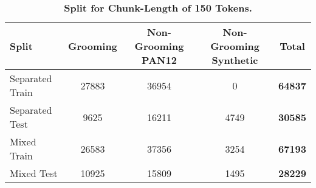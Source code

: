\begin{table}[H]
\centering
\small
\begin{tabular}{lcccc}
\hline
Split & Grooming & Non-Grooming PAN12 & Non-Grooming Synthetic & \textbf{Total} \\
\hline
Separated Train & 27883 & 36954 & 0    & \textbf{64837} \\
Separated Test  &  9625 & 16211 & 4749 & \textbf{30585} \\
\midrule[\heavyrulewidth]
Mixed Train     & 26583 & 37356 & 3254 & \textbf{67193} \\
Mixed Test      & 10925 & 15809 & 1495 & \textbf{28229} \\
\hline
\end{tabular}
\caption[Split for Chunk-Length of 150 Tokens]{\textbf{Split for Chunk-Length of 150 Tokens.}}
\end{table}
